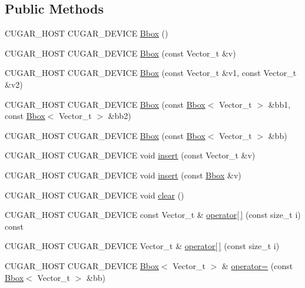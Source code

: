 \subsection*{Public Methods}
\begin{DoxyCompactItemize}
\item 
C\+U\+G\+A\+R\+\_\+\+H\+O\+ST C\+U\+G\+A\+R\+\_\+\+D\+E\+V\+I\+CE \hyperlink{structcugar_1_1_bbox_a06de7036f86e3f0d4784affe7da5a60c}{Bbox} ()
\item 
C\+U\+G\+A\+R\+\_\+\+H\+O\+ST C\+U\+G\+A\+R\+\_\+\+D\+E\+V\+I\+CE \hyperlink{structcugar_1_1_bbox_a228ae5e963feec2886d7e0475cc63940}{Bbox} (const Vector\+\_\+t \&v)
\item 
C\+U\+G\+A\+R\+\_\+\+H\+O\+ST C\+U\+G\+A\+R\+\_\+\+D\+E\+V\+I\+CE \hyperlink{structcugar_1_1_bbox_a62c4be1df668eb7ce6aa251652d21646}{Bbox} (const Vector\+\_\+t \&v1, const Vector\+\_\+t \&v2)
\item 
C\+U\+G\+A\+R\+\_\+\+H\+O\+ST C\+U\+G\+A\+R\+\_\+\+D\+E\+V\+I\+CE \hyperlink{structcugar_1_1_bbox_af26d1a12b2e7fd9397b7c949cb312e0e}{Bbox} (const \hyperlink{structcugar_1_1_bbox}{Bbox}$<$ Vector\+\_\+t $>$ \&bb1, const \hyperlink{structcugar_1_1_bbox}{Bbox}$<$ Vector\+\_\+t $>$ \&bb2)
\item 
C\+U\+G\+A\+R\+\_\+\+H\+O\+ST C\+U\+G\+A\+R\+\_\+\+D\+E\+V\+I\+CE \hyperlink{structcugar_1_1_bbox_a7b0f30b0465d422b3b9d92e34bcd679e}{Bbox} (const \hyperlink{structcugar_1_1_bbox}{Bbox}$<$ Vector\+\_\+t $>$ \&bb)
\item 
C\+U\+G\+A\+R\+\_\+\+H\+O\+ST C\+U\+G\+A\+R\+\_\+\+D\+E\+V\+I\+CE void \hyperlink{structcugar_1_1_bbox_ace1ccbf9df5fd13af14675c47a0eaba3}{insert} (const Vector\+\_\+t \&v)
\item 
C\+U\+G\+A\+R\+\_\+\+H\+O\+ST C\+U\+G\+A\+R\+\_\+\+D\+E\+V\+I\+CE void \hyperlink{structcugar_1_1_bbox_a615bba316b80598c6ecae65f2156167d}{insert} (const \hyperlink{structcugar_1_1_bbox}{Bbox} \&v)
\item 
C\+U\+G\+A\+R\+\_\+\+H\+O\+ST C\+U\+G\+A\+R\+\_\+\+D\+E\+V\+I\+CE void \hyperlink{structcugar_1_1_bbox_a9d73d928dcebfa0a9fd7f5ada019d3b9}{clear} ()
\item 
C\+U\+G\+A\+R\+\_\+\+H\+O\+ST C\+U\+G\+A\+R\+\_\+\+D\+E\+V\+I\+CE const Vector\+\_\+t \& \hyperlink{structcugar_1_1_bbox_aca0124ac5cae61c1b3c8885a6e0eab47}{operator\mbox{[}$\,$\mbox{]}} (const size\+\_\+t i) const
\item 
C\+U\+G\+A\+R\+\_\+\+H\+O\+ST C\+U\+G\+A\+R\+\_\+\+D\+E\+V\+I\+CE Vector\+\_\+t \& \hyperlink{structcugar_1_1_bbox_ae2c89d95f41ecc119b31e42defdccea4}{operator\mbox{[}$\,$\mbox{]}} (const size\+\_\+t i)
\item 
C\+U\+G\+A\+R\+\_\+\+H\+O\+ST C\+U\+G\+A\+R\+\_\+\+D\+E\+V\+I\+CE \hyperlink{structcugar_1_1_bbox}{Bbox}$<$ Vector\+\_\+t $>$ \& \hyperlink{structcugar_1_1_bbox_a2e82040a0dd47a328ffdf011553e40e0}{operator=} (const \hyperlink{structcugar_1_1_bbox}{Bbox}$<$ Vector\+\_\+t $>$ \&bb)
\end{DoxyCompactItemize}
